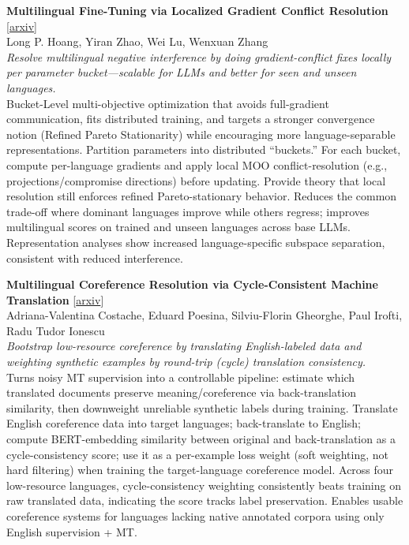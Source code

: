 \documentclass[12pt,letterpaper]{article}
\begin{document}
\medskip

{\small\textbf{Multilingual Fine-Tuning via Localized Gradient Conflict Resolution}} {\scriptsize[\href{https://arxiv.org/abs/2606.05613}{arxiv}]}\\
{\scriptsize Long P. Hoang, Yiran Zhao, Wei Lu, Wenxuan Zhang}\\

{\small\textit{Resolve multilingual negative interference by doing gradient-conflict fixes locally per parameter bucket---scalable for LLMs and better for seen and unseen languages.}}\\[1pt]
{\footnotesize Bucket-Level multi-objective optimization that avoids full-gradient communication, fits distributed training, and targets a stronger convergence notion (Refined Pareto Stationarity) while encouraging more language-separable representations. Partition parameters into distributed ``buckets.'' For each bucket, compute per-language gradients and apply local MOO conflict-resolution (e.g., projections/compromise directions) before updating. Provide theory that local resolution still enforces refined Pareto-stationary behavior. Reduces the common trade-off where dominant languages improve while others regress; improves multilingual scores on trained and unseen languages across base LLMs. Representation analyses show increased language-specific subspace separation, consistent with reduced interference.}

\medskip

{\small\textbf{Multilingual Coreference Resolution via Cycle-Consistent Machine Translation}} {\scriptsize[\href{https://arxiv.org/abs/2606.05444}{arxiv}]}\\
{\scriptsize Adriana-Valentina Costache, Eduard Poesina, Silviu-Florin Gheorghe, Paul Irofti, Radu Tudor Ionescu}\\

{\small\textit{Bootstrap low-resource coreference by translating English-labeled data and weighting synthetic examples by round-trip (cycle) translation consistency.}}\\[1pt]
{\footnotesize Turns noisy MT supervision into a controllable pipeline: estimate which translated documents preserve meaning/coreference via back-translation similarity, then downweight unreliable synthetic labels during training. Translate English coreference data into target languages; back-translate to English; compute BERT-embedding similarity between original and back-translation as a cycle-consistency score; use it as a per-example loss weight (soft weighting, not hard filtering) when training the target-language coreference model. Across four low-resource languages, cycle-consistency weighting consistently beats training on raw translated data, indicating the score tracks label preservation. Enables usable coreference systems for languages lacking native annotated corpora using only English supervision + MT.}
\end{document}
